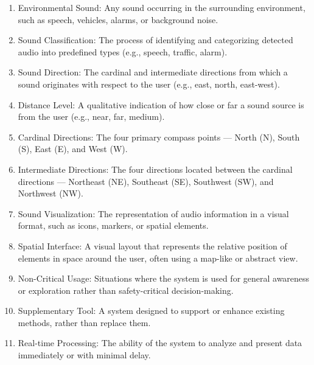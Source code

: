 \begin{enumerate}[leftmargin=80pt]
    \item Environmental Sound: Any sound occurring in the surrounding environment, such as speech, vehicles, alarms, or background noise.
    \item Sound Classification: The process of identifying and categorizing detected audio into predefined types (e.g., speech, traffic, alarm).
    \item Sound Direction: The cardinal and intermediate directions from which a sound originates with respect to the user (e.g., east, north, east-west).
    \item Distance Level: A qualitative indication of how close or far a sound source is from the user (e.g., near, far, medium).
    \item Cardinal Directions: The four primary compass points — North (N), South (S), East (E), and West (W).
    \item Intermediate Directions: The four directions located between the cardinal directions — Northeast (NE), Southeast (SE), Southwest (SW), and Northwest (NW).
    \item Sound Visualization: The representation of audio information in a visual format, such as icons, markers, or spatial elements.
    \item Spatial Interface: A visual layout that represents the relative position of elements in space around the user, often using a map-like or abstract view.
    \item Non-Critical Usage: Situations where the system is used for general awareness or exploration rather than safety-critical decision-making.
    \item Supplementary Tool: A system designed to support or enhance existing methods, rather than replace them.
    \item Real-time Processing: The ability of the system to analyze and present data immediately or with minimal delay.
\end{enumerate}
